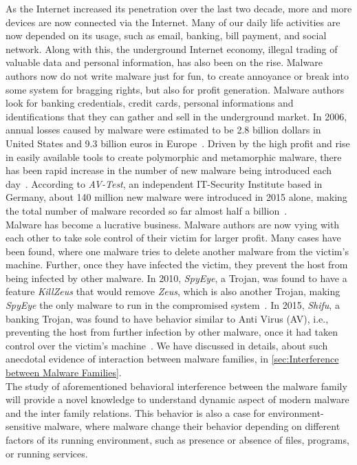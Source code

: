 As the Internet increased its penetration over the last two decade, more and more devices are now connected via the Internet.
Many of our daily life activities are now depended on its usage, such as email, banking, bill payment, and social network.
Along with this, the underground Internet economy, illegal trading of valuable data and personal information, has also been on the rise.
Malware authors now do not write malware just for fun, to create annoyance or break into some system for bragging rights, but also for profit generation.
Malware authors look for banking credentials, credit cards, personal informations and identifications that they can gather and sell in the underground market.
In 2006, annual losses caused by malware were estimated to be 2.8 billion dollars in United States and 9.3 billion euros in Europe~\cite[]{moore2009economics}.
Driven by the high profit and rise in easily available tools to create polymorphic and metamorphic malware, there has been rapid increase in the number of new malware being introduced each day~\cite[]{tian}.
According to \emph{AV-Test}, an independent IT-Security Institute based in Germany, about 140 million new malware were introduced in 2015 alone, making the total number of malware recorded so far almost half a billion~\cite[]{avtest}.
\\
Malware has become a lucrative business.
Malware authors are now vying with each other to take sole control of their victim for larger profit.
Many cases have been found, where one malware tries to delete another malware from the victim's machine.
Further, once they have infected the victim, they prevent the host from being infected by other malware.
In 2010, \emph{SpyEye}, a Trojan, was found to have a feature \emph{KillZeus} that would remove \emph{Zeus}, which is also another Trojan, making \emph{SpyEye} the only malware to run in the compromised system~\cite[]{sanszeus}.
In 2015, \emph{Shifu}, a banking Trojan, was found to have behavior similar to Anti Virus (AV), i.e., preventing the host from further infection by other malware, once it had taken control over the victim's machine~\cite[]{secintelshifu}.
We have discussed in details, about such anecdotal evidence of interaction between malware families, in \autoref{sec:Interference between Malware Families}.\\
The study of aforementioned behavioral interference between the malware family will provide a novel knowledge to understand dynamic aspect of modern malware and the inter family relations.
This behavior is also a case for environment-sensitive malware, where malware change their behavior depending on different factors of its running environment, such as presence or absence of files, programs, or running services.

